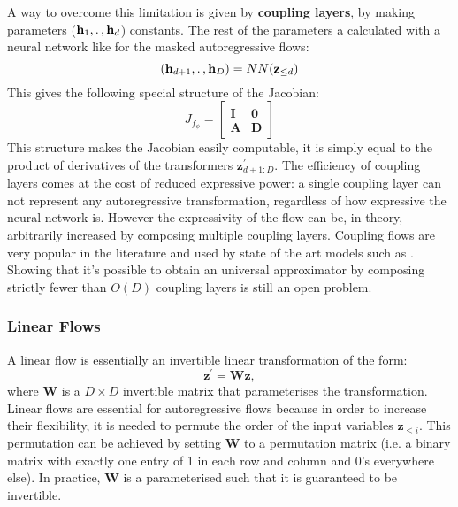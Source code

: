\documentclass[english]{scrartcl}
\begin{document}
    A way to overcome this limitation is given by \textbf{coupling layers}, by making parameters ($\textbf{h}_1, \ldotp, \textbf{h}_d$) constants.
    The rest of the parameters a calculated with a neural network like for the masked autoregressive flows:
    \begin{equation}
    (\textbf{h}_{d+1}, \ldotp, \textbf{h}_D)
        = NN(\textbf{z}_{\leq d})
    \end{equation}
    This gives the following special structure of the Jacobian:
    \begin{equation}
        J_{f_{\phi}} = \begin{bmatrix}
                           \textbf{I} & \textbf{0}\\
                           \textbf{A} & \textbf{D}
        \end{bmatrix}
    \end{equation}
    This structure makes the Jacobian easily computable, it is simply equal to the product of derivatives of the
    transformers $\textbf{z}^{\prime}_{d+1:D}$.
    The efficiency of coupling layers comes at the cost of reduced expressive power: a single coupling layer can not represent
    any autoregressive transformation, regardless of how expressive the neural network is.
    However the expressivity of the flow can be, in theory, arbitrarily increased by composing multiple coupling layers.
    Coupling flows are very popular in the literature and used by state of the art models such as \citep[NICE, Glow, WaveGlow, Flow++][]{dinh_nice_2015,kingma_glow_2018, prenger_waveglow_2019, ho_flow_2019}.
    Showing that it's possible to obtain an universal approximator by composing strictly fewer than $O(D)$ coupling layers is still an open problem.

    \subsubsection{Linear Flows}
    A linear flow is essentially an invertible linear transformation of the form:
    \begin{equation}
        \textbf{z}^{\prime} = \textbf{W} \textbf{z},
    \end{equation}
    where $\textbf{W}$ is a $D \times D$ invertible matrix that parameterises the transformation.
    Linear flows are essential for autoregressive flows because in order to increase their flexibility, it is needed to permute the order of the input variables $\textbf{z}_{\leq i}$.
    This permutation can be achieved by setting $\textbf{W}$ to a permutation matrix (i.e. a binary matrix with exactly one entry of 1 in each row and column and 0's everywhere else).
    In practice, $\textbf{W}$ is a parameterised such that it is guaranteed to be invertible.
\end{document}
